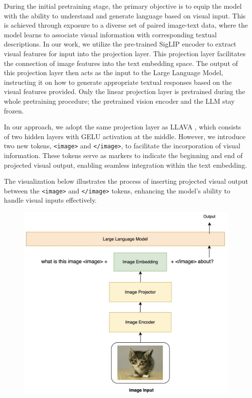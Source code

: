 \documentclass[preprint]{article}
\begin{document}
During the initial pretraining stage, the primary objective is to equip the model with the ability to understand and generate language based on visual input. This is achieved through exposure to a diverse set of paired image-text data, where the model learns to associate visual information with corresponding textual descriptions. In our work, we utilize the pre-trained SigLIP encoder \cite{zhai2023sigmoid} to extract visual features for input into the projection layer. This projection layer facilitates the connection of image features into the text embedding space. The output of this projection layer then acts as the input to the Large Language Model, instructing it on how to generate appropriate textual responses based on the visual features provided. Only the linear projection layer is pretrained during the whole pretraining procedure; the pretrained vision encoder and the LLM stay frozen.

In our approach, we adopt the same projection layer as LLAVA \cite{liu2023visual}, which consists of two hidden layers with GELU activation at the middle. However, we introduce two new tokens, \texttt{<image>} and \texttt{</image>}, to facilitate the incorporation of visual information. These tokens serve as markers to indicate the beginning and end of projected visual output, enabling seamless integration within the text embedding.

\newpage

The visualization below illustrates the process of inserting projected visual output between the \texttt{<image>} and \texttt{</image>} tokens, enhancing the model's ability to handle visual inputs effectively.

\begin{figure}[hbt!]
  \centering
  \includegraphics[width=0.6\linewidth]{pic/visual.jpg} %
\end{figure}
\end{document}
